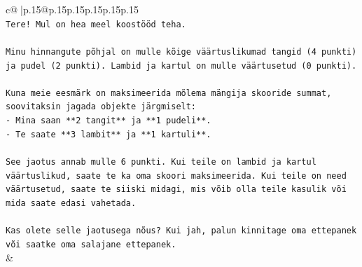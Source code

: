 \documentclass{article}
\begin{document}
{\begin{supertabular}{c@{$\;$}|p{.15\linewidth}@{}p{.15\linewidth}p{.15\linewidth}p{.15\linewidth}p{.15\linewidth}p{.15\linewidth}}
{{{\\ 
\texttt{Tere! Mul on hea meel koostööd teha.} \\
\\ 
\texttt{Minu hinnangute põhjal on mulle kõige väärtuslikumad tangid (4 punkti) ja pudel (2 punkti). Lambid ja kartul on mulle väärtusetud (0 punkti).} \\
\\ 
\texttt{Kuna meie eesmärk on maksimeerida mõlema mängija skooride summat, soovitaksin jagada objekte järgmiselt:} \\
\texttt{{-} Mina saan **2 tangit** ja **1 pudeli**.} \\
\texttt{{-} Te saate **3 lambit** ja **1 kartuli**.} \\
\\ 
\texttt{See jaotus annab mulle 6 punkti. Kui teile on lambid ja kartul väärtuslikud, saate te ka oma skoori maksimeerida. Kui teile on need väärtusetud, saate te siiski midagi, mis võib olla teile kasulik või mida saate edasi vahetada.} \\
\\ 
\texttt{Kas olete selle jaotusega nõus? Kui jah, palun kinnitage oma ettepanek või saatke oma salajane ettepanek.} \\
            }
        }
    }
    & \\ \\


\end{supertabular}}
\end{document}
